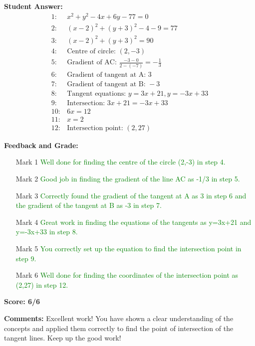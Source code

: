 \documentclass{article}
\begin{document}
\textbf{Student Answer:}
\begin{align*}
1: & x^2+y^2-4x+6y-77=0 \\
2: & (x-2)^2+(y+3)^2-4-9=77 \\
3: & (x-2)^2+(y+3)^2=90 \\
4: & \text{Centre of circle: } (2,-3) \\
5: & \text{Gradient of AC: } \frac{-3-0}{2-(-7)} = -\frac{1}{3} \\
6: & \text{Gradient of tangent at A: } 3 \\
7: & \text{Gradient of tangent at B: } -3 \\
8: & \text{Tangent equations: } y=3x+21, y=-3x+33 \\
9: & \text{Intersection: } 3x+21=-3x+33 \\
10: & 6x=12 \\
11: & x=2 \\
12: & \text{Intersection point: } (2,27)
\end{align*}

\textbf{Feedback and Grade:}
\begin{itemize}
\item[Mark 1] \textcolor{green}{Well done for finding the centre of the circle (2,-3) in step 4.}
\item[Mark 2] \textcolor{green}{Good job in finding the gradient of the line AC as -1/3 in step 5.}
\item[Mark 3] \textcolor{green}{Correctly found the gradient of the tangent at A as 3 in step 6 and the gradient of the tangent at B as -3 in step 7.}
\item[Mark 4] \textcolor{green}{Great work in finding the equations of the tangents as y=3x+21 and y=-3x+33 in step 8.}
\item[Mark 5] \textcolor{green}{You correctly set up the equation to find the intersection point in step 9.}
\item[Mark 6] \textcolor{green}{Well done for finding the coordinates of the intersection point as (2,27) in step 12.}
\end{itemize}

\textbf{Score: 6/6}

\textbf{Comments:} Excellent work! You have shown a clear understanding of the concepts and applied them correctly to find the point of intersection of the tangent lines. Keep up the good work!
\end{document}
